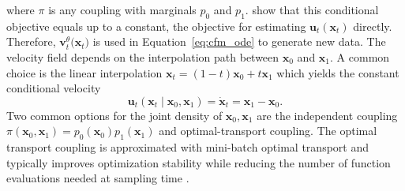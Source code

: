  where $\pi$ is any coupling with marginals $p_0$ and $p_1$. \citet{Lipman2023} show that this conditional objective equals up to a constant, the objective for estimating $\boldsymbol{u}_t(\boldsymbol{x}_t)$ directly. Therefore, $\boldsymbol{v}^\theta_t\big(\boldsymbol{x}_t\big)$ is used in  Equation~\ref{eq:cfm_ode} to generate new data. The velocity field depends on the interpolation path between $\boldsymbol{x}_0$ and $\boldsymbol{x}_1$.  A common choice is the linear interpolation $\boldsymbol{x}_t=(1-t)\boldsymbol{x}_0+t\boldsymbol{x}_1$
which yields the constant conditional velocity
\[
\boldsymbol{u}_t(\boldsymbol{x}_t\mid\boldsymbol{x}_0,\boldsymbol{x}_1)=\dot{\boldsymbol{x}}_t=\boldsymbol{x}_1-\boldsymbol{x}_0.
\]
Two common options for the joint density of $\boldsymbol{x}_0,\boldsymbol{x}_1$ are the independent coupling $\pi(\boldsymbol{x}_0,\boldsymbol{x}_1)=p_0(\boldsymbol{x}_0)p_1(\boldsymbol{x}_1)$ and optimal-transport coupling.
The optimal transport coupling is approximated with mini-batch optimal transport and typically improves optimization stability while reducing the number of function evaluations needed at sampling time \citep{Tong2024}.


